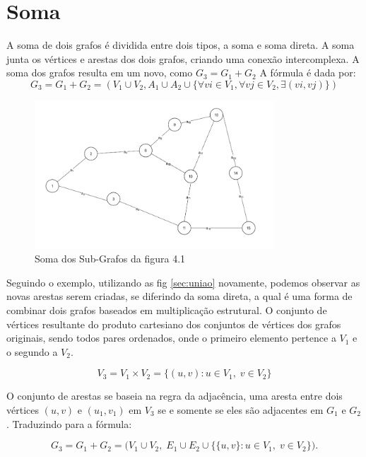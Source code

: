 \documentclass[
12pt,
a4paper,
semrecuonosumario,
sumario = abnt-6027-2012]{report}
\begin{document}
	\section{Soma}\label{sec:soma}
    A soma de dois grafos é dividida entre dois tipos, a soma e soma direta.
    A soma junta os vértices e arestas dos dois grafos, criando uma conexão intercomplexa. A soma dos grafos resulta em um novo, como $G_3 = G_1 + G_2$ A fórmula é dada por:
    \[
    G_3 = G_1 + G_2 = (V_1 \cup V_2, A_1 \cup A_2 \cup \{ \forall vi \in V_1, \forall vj \in V_2, \exists(vi, vj) \})
    \]

    \begin{figure}[!h]
        \centering
        \includegraphics[width=0.8\textwidth]{figuras/subgrafos/subgrafo_soma.png}
        \caption{Soma dos Sub-Grafos da figura 4.1}
            \label{fig:somaGrafos}
    \end{figure}

    Seguindo o exemplo, utilizando as fig \ref{sec:uniao} novamente, podemos observar as novas arestas serem criadas, se diferindo da soma direta, a qual é uma forma de combinar dois grafos baseados em multiplicação estrutural. O conjunto de vértices resultante do produto cartesiano dos conjuntos de vértices dos grafos originais, sendo todos pares ordenados, onde o primeiro elemento pertence a $V_1$ e o segundo a $V_2$.

    \[
    V_3 = V_1 \times V_2 = \{(u,v):u\in V_1,\; v\in V_2\}
    \]

    O conjunto de arestas se baseia na regra da adjacência, uma aresta entre dois vértices $(u, v)$ e $(u_1, v_1)$ em $V_3$ se e somente se eles são adjacentes em $G_1$ e $G_2$. Traduzindo para a fórmula:

    \[ %
    G_3 = G_1+G_2=\big(V_1\cup V_2,\;E_1\cup E_2\cup \{\{u,v\}:u\in V_1,\; v\in V_2\}\big).
    \]
\end{document}
